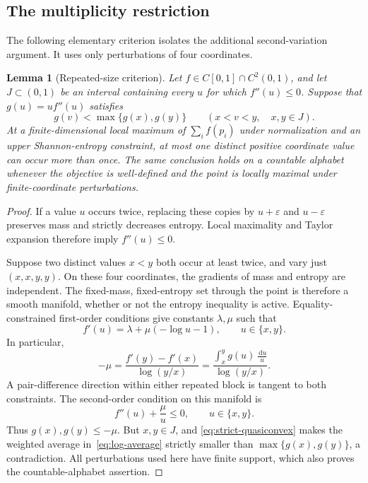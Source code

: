 \documentclass[11pt]{article}
\numberwithin{equation}{section}
\newtheorem{lemma}[theorem]{Lemma}
\newcommand{\dd}{\,\mathrm d}
\begin{document}
\subsection{The multiplicity restriction}
The following elementary criterion isolates the additional second-variation
argument. It uses only perturbations of four coordinates.

\begin{lemma}[Repeated-size criterion]\label{lem:repeated}
Let $f\in C[0,1]\cap C^2(0,1)$, and let $J\subset(0,1)$ be an interval
containing every $u$ for which $f''(u)\le0$. Suppose that $g(u)=uf''(u)$
satisfies
\begin{equation}\label{eq:strict-quasiconvex}
 g(v)<\max\{g(x),g(y)\}\qquad(x<v<y,\quad x,y\in J).
\end{equation}
At a finite-dimensional local maximum of $\sum_i f(p_i)$ under normalization
and an upper Shannon-entropy constraint, at most one distinct positive
coordinate value can occur more than once. The same conclusion holds on a
countable alphabet whenever the objective is well-defined and the point is
locally maximal under finite-coordinate perturbations.
\end{lemma}
\begin{proof}
If a value $u$ occurs twice, replacing these copies by $u+\varepsilon$ and
$u-\varepsilon$ preserves mass and strictly decreases entropy. Local
maximality and Taylor expansion therefore imply $f''(u)\le0$.

Suppose two distinct values $x<y$ both occur at least twice, and vary just
$(x,x,y,y)$. On these four coordinates, the gradients of mass and entropy
are independent. The fixed-mass, fixed-entropy set through the point is
therefore a smooth manifold, whether or not the entropy inequality is
active. Equality-constrained first-order conditions give constants
$\lambda,\mu$ such that
\[
 f'(u)=\lambda+\mu(-\log u-1),\qquad u\in\{x,y\}.
\]
In particular,
\begin{equation}\label{eq:log-average}
 -\mu=\frac{f'(y)-f'(x)}{\log(y/x)}
 =\frac{\displaystyle\int_x^y g(u)\,\frac{\dd u}{u}}
        {\log(y/x)}.
\end{equation}
A pair-difference direction within either repeated block is tangent to both
constraints. The second-order condition on this manifold is
\[
 f''(u)+\frac\mu u\le0,\qquad u\in\{x,y\}.
\]
Thus $g(x),g(y)\le-\mu$. But $x,y\in J$, and
\eqref{eq:strict-quasiconvex} makes the weighted average
in~\eqref{eq:log-average} strictly smaller than
$\max\{g(x),g(y)\}$, a contradiction. All perturbations used here have
finite support, which also proves the countable-alphabet assertion.
\end{proof}
\end{document}
